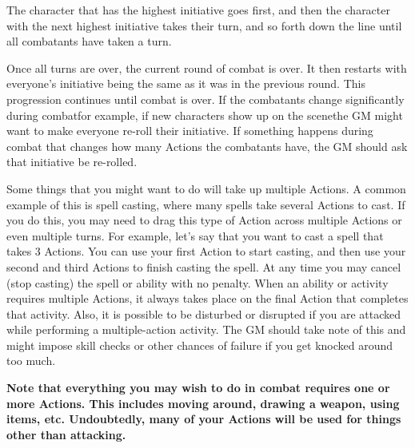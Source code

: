 \documentclass[twoside]{book}
\begin{document}
  

  

  
    {  
     The character that has the highest initiative goes
             first, and then the character with the next highest
             initiative takes their turn, and so forth down the line
             until all combatants have taken a turn. 
    }
  
    {  
     Once all turns are over, the current round of combat
             is over. It then restarts with everyone's initiative
             being the same as it was in the previous round. This
             progression continues until combat is over. If the
             combatants change significantly during combatfor
             example, if new characters show up on the scenethe GM
             might want to make everyone re-roll their initiative. If
             something happens during combat that changes how many
             Actions the combatants have, the GM should ask that
             initiative be re-rolled. 
    }
  
    {  
     Some things that you might want to do will take up
             multiple Actions. A common example of this is spell casting,
             where many spells take several Actions to cast. If you do
             this, you may need to drag this type of Action across
             multiple Actions or even multiple turns. For example,
             let's say that you want to cast a spell that takes 3
             Actions. You can use your first Action to start casting, and
             then use your second and third Actions to finish casting the
             spell. At any time you may cancel (stop casting) the spell
             or ability with no penalty. When an ability or activity
             requires multiple Actions, it always takes place on the
             final Action that completes that activity. Also, it is
             possible to be disturbed or disrupted if you are attacked
             while performing a multiple-action activity. The GM should
             take note of this and might impose skill checks or other
             chances of failure if you get knocked around too much.
             
    }
  

 \textbf{ Note that everything you may wish to do in combat
             requires one or more Actions. This includes moving around,
             drawing a weapon, using items, etc. Undoubtedly, many of
             your Actions will be used for things other than attacking.
             }
\end{document}
